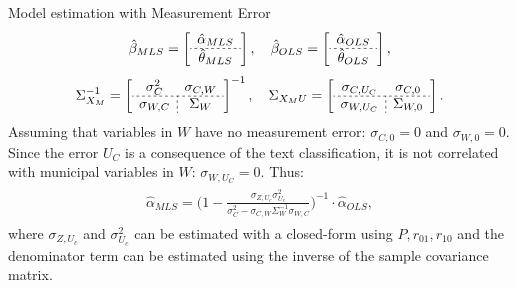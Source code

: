 \documentclass[handout,t,usenames,dvipsnames]{beamer}
\begin{document}
\begin{frame}{Model estimation with Measurement Error}
\justifying
\small
\vspace{1em}
\[
   \hat{\beta}_{MLS} = \left[
\begin{array}{c}
\hat{\alpha}_{MLS}  \\
\hdashline[2pt/2pt]
\hat{\theta}_{MLS}
\end{array}
\right],    \quad \hat{\beta}_{OLS} = \left[
\begin{array}{c}
\hat{\alpha}_{OLS}  \\
\hdashline[2pt/2pt]
\hat{\theta}_{OLS}
\end{array}
\right],
\]
\[
\Sigma_{X_{M}}^{-1}=
\left[
\begin{array}{c;{2pt/2pt}c}
\sigma^2_{C} & \sigma_{C,W} \\
\hdashline[2pt/2pt]
\sigma_{W,C} & \Sigma_{W}
\end{array}
\right]^{-1}, \quad  \Sigma_{X_{M}U}= \left[
\begin{array}{c;{2pt/2pt}c}
\sigma_{C,U_C} & \sigma_{C,0} \\
\hdashline[2pt/2pt]
\sigma_{W,U_C} & \Sigma_{W,0}
\end{array}
\right].
\]
Assuming that variables in $W$ have no measurement error: $\sigma_{C,0}=0$ and $\sigma_{W,0}=0$. Since the error $U_C$ is a consequence of the text classification, it is not correlated with municipal variables in $W$: $\sigma_{W,U_C}=0$. Thus:
\begin{align*}
\label{MLS_true}
    \begin{split}
    \hat{\alpha}_{MLS} = \Big(1 - \frac{\sigma_{Z,U_c} \sigma^2_{U_c}}{\sigma^2_{C} - \sigma_{C,W}\Sigma_W^{-1}\sigma_{W,C}} \Big) ^{-1} \cdot \hat{\alpha}_{OLS},
    \end{split}
\end{align*}
\small where $\sigma_{Z,U_c}$ and $\sigma^2_{U_c}$ can be estimated with a closed-form using $P, r_{01}, r_{10}$ and the denominator term can be estimated using the inverse of the sample covariance matrix.

\end{frame}
\end{document}
